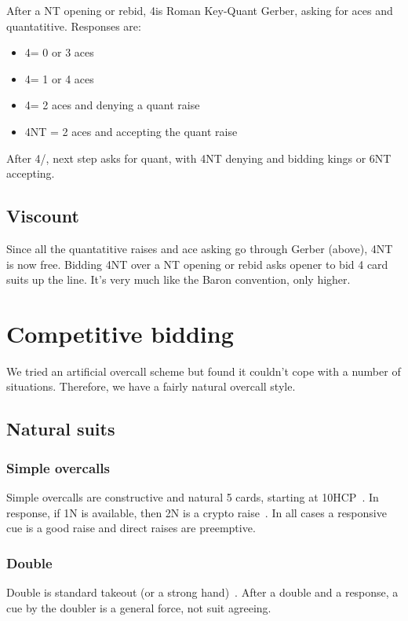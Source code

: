 \documentclass[a4paper,14pt]{extarticle}
\begin{document}
After a NT opening or rebid, 4\clubs is Roman Key-Quant Gerber, asking for
aces and quantatitive. Responses are:

\begin{itemize}
	\item 4\diamonds = 0 or 3 aces
	\item 4\hearts = 1 or 4 aces
	\item 4\spades = 2 aces and denying a quant raise
	\item 4NT = 2 aces and accepting the quant raise
\end{itemize}

After 4\diamonds/\hearts, next step asks for quant, with 4NT denying
and bidding kings or 6NT accepting.

\subsection{Viscount}
\label{sec:viscount}

Since all the quantatitive raises and ace asking go through Gerber (above), 4NT
is now free. Bidding 4NT over a NT opening or rebid asks opener to bid 4 card
suits up the line. It's very much like the Baron convention, only higher.

\section{Competitive bidding}
\label{sec:competitive}

We tried an artificial overcall scheme but found it couldn't cope with a number of situations.
Therefore, we have a fairly natural overcall style.

\subsection{Natural suits}
\label{sec:def:1x}

\subsubsection{Simple overcalls}
Simple overcalls are constructive and natural 5 cards, starting at
10HCP~. In response, if 1N is available, then 2N is a crypto
raise~. In all cases a responsive cue is a good raise and
direct raises are preemptive.

\subsubsection{Double}
Double is standard takeout (or a strong hand)~. After a double and
a response, a cue by the doubler is a general force, not suit agreeing.
\end{document}
